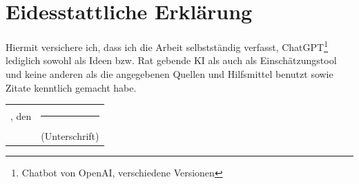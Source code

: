 	\clearpage{\pagestyle{empty}\cleardoublepage}
%
%
%
	\clearpage{\pagestyle{empty}\cleardoublepage}%
%
%
%
%
%
%
	\vspace*{2em}%
	\section*{Eidesstattliche Erklärung}%
	\noindent Hiermit versichere ich, dass ich die Arbeit selbstständig verfasst, ChatGPT\footnote{Chatbot von OpenAI, verschiedene Versionen} lediglich sowohl als Ideen bzw. Rat gebende KI als auch als Einschätzungstool und keine anderen als die angegebenen Quellen und Hilfsmittel benutzt sowie Zitate kenntlich gemacht habe.
	
	\begin{tabular}{lc}%
	\ort, den \abgabedatum \hspace*{1cm}& \rule[2px]{5cm}{0.5px}\\%
	                                    &\footnotesize{(Unterschrift)}%
	\end{tabular}
	
